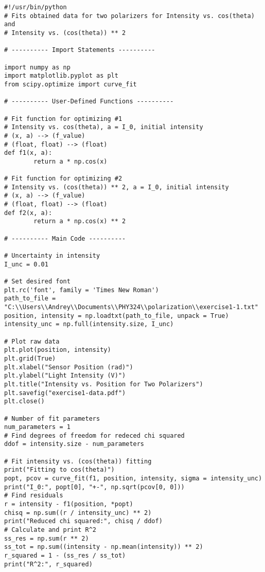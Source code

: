 \begin{lstlisting}
#!/usr/bin/python
# Fits obtained data for two polarizers for Intensity vs. cos(theta) and
# Intensity vs. (cos(theta)) ** 2

# ---------- Import Statements ----------

import numpy as np
import matplotlib.pyplot as plt
from scipy.optimize import curve_fit

# ---------- User-Defined Functions ----------

# Fit function for optimizing #1
# Intensity vs. cos(theta), a = I_0, initial intensity
# (x, a) --> (f_value)
# (float, float) --> (float)
def f1(x, a):
        return a * np.cos(x)

# Fit function for optimizing #2
# Intensity vs. (cos(theta)) ** 2, a = I_0, initial intensity
# (x, a) --> (f_value)
# (float, float) --> (float)
def f2(x, a):
        return a * np.cos(x) ** 2

# ---------- Main Code ----------

# Uncertainty in intensity
I_unc = 0.01

# Set desired font
plt.rc('font', family = 'Times New Roman')
path_to_file = "C:\\Users\\Andrey\\Documents\\PHY324\\polarization\\exercise1-1.txt"
position, intensity = np.loadtxt(path_to_file, unpack = True)
intensity_unc = np.full(intensity.size, I_unc)

# Plot raw data
plt.plot(position, intensity)
plt.grid(True)
plt.xlabel("Sensor Position (rad)")
plt.ylabel("Light Intensity (V)")
plt.title("Intensity vs. Position for Two Polarizers")
plt.savefig("exercise1-data.pdf")
plt.close()

# Number of fit parameters
num_parameters = 1
# Find degrees of freedom for redeced chi squared
ddof = intensity.size - num_parameters

# Fit intensity vs. (cos(theta)) fitting
print("Fitting to cos(theta)")
popt, pcov = curve_fit(f1, position, intensity, sigma = intensity_unc)
print("I_0:", popt[0], "+-", np.sqrt(pcov[0, 0]))
# Find residuals
r = intensity - f1(position, *popt)
chisq = np.sum((r / intensity_unc) ** 2)
print("Reduced chi squared:", chisq / ddof)
# Calculate and print R^2
ss_res = np.sum(r ** 2)
ss_tot = np.sum((intensity - np.mean(intensity)) ** 2)
r_squared = 1 - (ss_res / ss_tot)
print("R^2:", r_squared)


\end{lstlisting}
